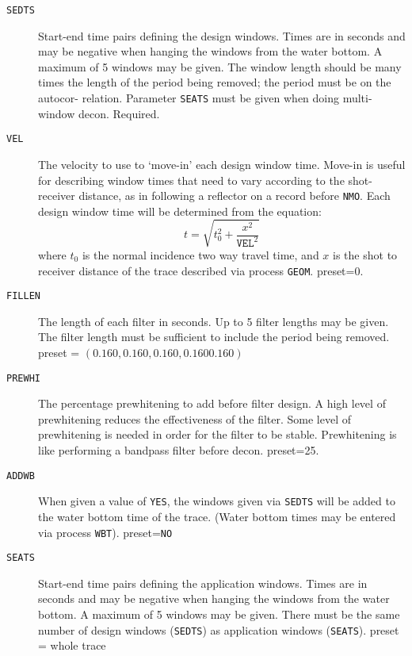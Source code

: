 \begin{description}
\item[\texttt{SEDTS}] Start-end time pairs defining the design windows.  Times are in seconds and may be negative when hanging the windows from the water bottom.  A maximum of 5 windows may be given.  The window length should be many times the length of the period being removed; the period must be on the autocor- relation.  Parameter \texttt{SEATS} must be given when doing multi- window decon.  Required.

     \item[\texttt{VEL}] The velocity to use to `move-in' each design window time.  Move-in is useful for describing window times that need to vary according to the shot-receiver distance, as in following a reflector on a record before \texttt{NMO}.  Each design window time will be determined from the equation:
         \begin{equation}
             t = \sqrt{t_{0}^{2} + \dfrac{x^{2}}{\texttt{VEL}^{2}}}
         \end{equation}
         where $t_{0}$ is the normal incidence two way travel time, and $x$ is the \gls{shot} to receiver distance of the trace described via process \texttt{GEOM}.  \Gls{preset}=0.

     \item[\texttt{FILLEN}] The length of each filter in seconds.  Up to 5 filter lengths may be given.  The filter length must be sufficient to include the period being removed.  \Gls{preset} = $(0.160, 0.160, 0.160, 0.160 0.160)$

     \item[\texttt{PREWHI}] The percentage prewhitening to add before filter design.  A high level of prewhitening reduces the effectiveness of the filter.  Some level of prewhitening is needed in order for the filter to be stable.  Prewhitening is like performing a bandpass filter before decon.  \Gls{preset}=25.

     \item[\texttt{ADDWB}] When given a value of \texttt{YES}, the windows given via \texttt{SEDTS} will be added to the water bottom time of the trace.  (Water bottom times may be entered via process \texttt{WBT}).  \Gls{preset}=\texttt{NO}

     \item[\texttt{SEATS}] Start-end time pairs defining the application windows.  Times are in seconds and may be negative when hanging the windows from the water bottom.  A maximum of 5 windows may be given.  There must be the same number of design windows (\texttt{SEDTS}) as application windows (\texttt{SEATS}).  \Gls{preset} = whole trace


\end{description}
